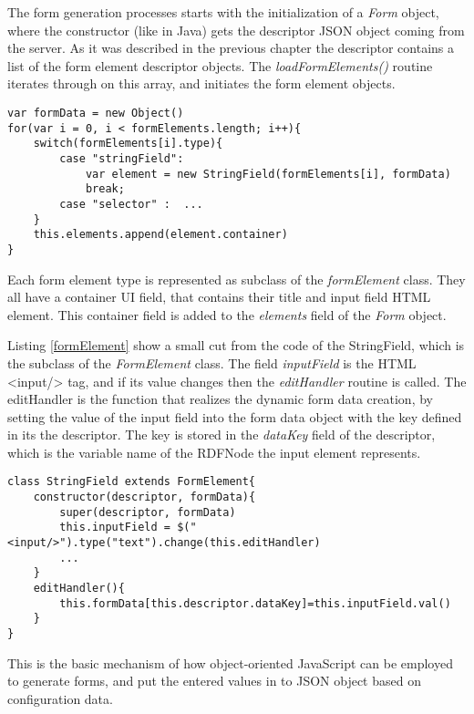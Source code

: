 The form generation processes starts with the initialization of a \textit{Form} object, where the constructor (like in Java) gets the descriptor JSON object coming from the server. As it was described in the previous chapter the descriptor contains a list of the form element descriptor objects. The \textit{loadFormElements()} routine iterates through on this array, and initiates the form element objects.

\begin{lstlisting}[basicstyle=\footnotesize, frame=single, caption={Form generation based on configuration data}, label=formGen captionpos=b, belowskip=1em, aboveskip=2em]
var formData = new Object()
for(var i = 0, i < formElements.length; i++){
	switch(formElements[i].type){
		case "stringField":
			var element = new StringField(formElements[i], formData)
			break;
		case "selector" :  ...
	}
	this.elements.append(element.container)
}	
\end{lstlisting}


Each form element type is represented as subclass of the \textit{formElement} class. They all have a container UI field, that contains their title and input field HTML element. This container field is added to the \textit{elements} field of the \textit{Form} object.

Listing \ref{formElement} show a small cut from the code of the StringField, which is the subclass of the \textit{FormElement} class. The field \textit{inputField} is the HTML <input/> tag, and if its value changes then the \textit{editHandler} routine is called. The editHandler is the function that realizes the dynamic form data creation, by setting the value of the input field into the form data object with the key defined in its the descriptor. The key is stored in the \textit{dataKey} field of the descriptor, which is the variable name of the RDFNode the input element represents.


\begin{lstlisting}[basicstyle=\footnotesize, frame=single, caption={Form element}, label=formElement, captionpos=b, belowskip=1em, aboveskip=2em]
class StringField extends FormElement{
	constructor(descriptor, formData){
		super(descriptor, formData)
		this.inputField = $("<input/>").type("text").change(this.editHandler)
		...
	}
	editHandler(){
		this.formData[this.descriptor.dataKey]=this.inputField.val() 
	}			
}
\end{lstlisting}

This is the basic mechanism of how object-oriented JavaScript can be employed to generate forms, and put the entered values in to JSON object based on configuration data.


